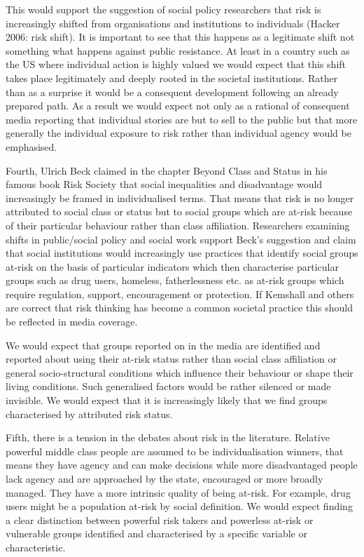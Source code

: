 This would support the suggestion of social policy researchers that risk is increasingly shifted from organisations and institutions to individuals (Hacker 2006: risk shift). It is important to see that this happens as a legitimate shift not something what happens against public resistance. At least in a country such as the US where individual action is highly valued we would expect that this shift takes place legitimately and deeply rooted in the societal institutions. Rather than as a surprise it would be a consequent development following an already prepared path. As a result we would expect not only as a rational of consequent media reporting that individual stories are but to sell to the public but that more generally the individual exposure to risk rather than individual agency would be emphasised.

Fourth, Ulrich Beck claimed in the chapter Beyond Class and Status in his famous book Risk Society that social inequalities and disadvantage would increasingly be framed in individualised terms. That means that risk is no longer attributed to social class or status but to social groups which are at-risk because of their particular behaviour rather than class affiliation. Researchers examining shifts in public/social policy and social work support Beck's suggestion and claim that social institutions would increasingly use practices that identify social groups at-risk on the basis of particular indicators which then characterise particular groups such as drug users, homeless, fatherlessness etc. as at-risk groups which require regulation, support, encouragement or protection. If Kemshall and others are correct that risk thinking has become a common societal practice this should be reflected in media coverage.

We would expect that groups reported on in the media are identified and reported about using their at-risk status rather than social class affiliation or general socio-structural conditions which influence their behaviour or shape their living conditions. Such generalised factors would be rather silenced or made invisible. We would expect that it is increasingly likely that we find groups characterised by attributed risk status.

Fifth, there is a tension in the debates about risk in the literature. Relative powerful middle class people are assumed to be individualisation winners, that means they have agency and can make decisions while more disadvantaged people lack agency and are approached by the state, encouraged or more broadly managed. They have a more intrinsic quality of being at-risk. For example, drug users might be a population at-risk by social definition. We would expect finding a clear distinction between powerful risk takers and powerless at-risk or vulnerable groups identified and characterised by a specific variable or characteristic.

